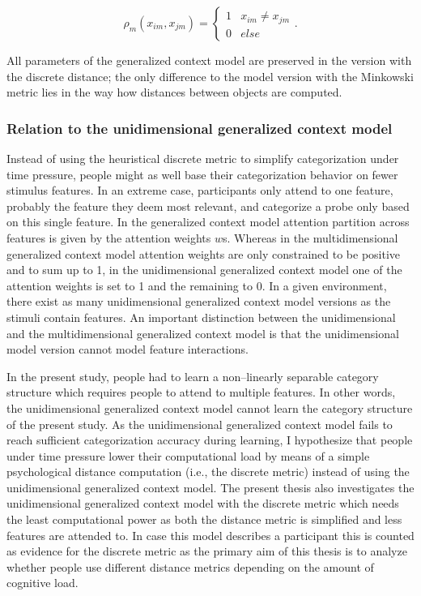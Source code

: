 \documentclass[a4paper,man,natbib]{apa6}
\begin{document}
\begin{equation}
\rho_{m}(x_{im}, x_{jm}) = 
\begin{cases}
	1 & x_{im} \neq x_{jm} \\
	0 & else 
\end{cases}.
\end{equation}

All parameters of the generalized context model are preserved in the version with the discrete distance; the only difference to the model version with the Minkowski metric lies in the way how distances between objects are computed.

\subsubsection{Relation to the unidimensional generalized context model}
Instead of using the heuristical discrete metric to simplify categorization under time pressure, people might as well base their categorization behavior on fewer stimulus features. In an extreme case, participants only attend to one feature, probably the feature they deem most relevant, and categorize a probe only based on this single feature. In the generalized context model \citep{nosofsky1989further} attention partition across features is given by the attention weights $w$s. Whereas in the multidimensional generalized context model attention weights are only constrained to be positive and to sum up to 1, in the unidimensional generalized context model one of the attention weights is set to 1 and the remaining to 0. In a given environment, there exist as many unidimensional generalized context model versions as the stimuli contain features. An important distinction between the unidimensional and the multidimensional generalized context model is that the unidimensional model version cannot model feature interactions. 

In the present study, people had to learn a non--linearly separable category structure which requires people to attend to multiple features. In other words, the unidimensional generalized context model cannot learn the category structure of the present study. As the unidimensional generalized context model fails to reach sufficient categorization accuracy during learning, I hypothesize that people under time pressure lower their computational load by means of a simple psychological distance computation (i.e., the discrete metric) instead of using the unidimensional generalized context model. The present thesis also investigates the unidimensional generalized context model with the discrete metric which needs the least computational power as both the distance metric is simplified and less features are attended to. In case this model describes a participant this is counted as evidence for the discrete metric as the primary aim of this thesis is to analyze whether people use different distance metrics depending on the amount of cognitive load.
 
\end{document}
